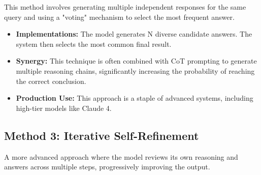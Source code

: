 This method involves generating multiple independent responses for the same query and using a "voting" mechanism to select the most frequent answer.

\begin{itemize}
  \item \textbf{Implementations:} The model generates N diverse candidate answers. The system then selects the most common final result.
  \item \textbf{Synergy:} This technique is often combined with CoT prompting to generate multiple reasoning chains, significantly increasing the probability of reaching the correct conclusion.
  \item \textbf{Production Use:} This approach is a staple of advanced systems, including high-tier models like Claude 4.
\end{itemize}

\subsection{Method 3: Iterative Self-Refinement}

A more advanced approach where the model reviews its own reasoning and answers across multiple steps, progressively improving the output.





